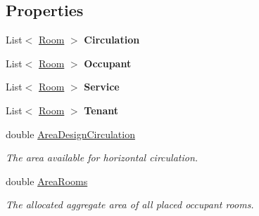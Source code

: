 \subsection*{Properties}
\begin{DoxyCompactItemize}
\item 
\mbox{\label{class_room_kit_1_1_scope_abdb1f8c3a8dfc6c0ddafc408d3b8b2af}} 
List$<$ \mbox{\hyperlink{class_room_kit_1_1_room}{Room}} $>$ {\bfseries Circulation}
\item 
\mbox{\label{class_room_kit_1_1_scope_a87ae2a0ad6f8577d4b8b8e3f59b5aa82}} 
List$<$ \mbox{\hyperlink{class_room_kit_1_1_room}{Room}} $>$ {\bfseries Occupant}
\item 
\mbox{\label{class_room_kit_1_1_scope_acf48a53dfd5f5a3173a6b519877aafb1}} 
List$<$ \mbox{\hyperlink{class_room_kit_1_1_room}{Room}} $>$ {\bfseries Service}
\item 
\mbox{\label{class_room_kit_1_1_scope_aaa56dc19dac96f7b98fb5dc6b99e4e24}} 
List$<$ \mbox{\hyperlink{class_room_kit_1_1_room}{Room}} $>$ {\bfseries Tenant}
\item 
double \mbox{\hyperlink{class_room_kit_1_1_scope_a200fe506134a03f68c90643f725b41a5}{Area\+Design\+Circulation}}
\begin{DoxyCompactList}\small\item\em The area available for horizontal circulation. \end{DoxyCompactList}\item 
double \mbox{\hyperlink{class_room_kit_1_1_scope_a77ffe9538de183ca2b5197816cd8ed36}{Area\+Rooms}}
\begin{DoxyCompactList}\small\item\em The allocated aggregate area of all placed occupant rooms. \end{DoxyCompactList}\item 

\end{DoxyCompactItemize}
